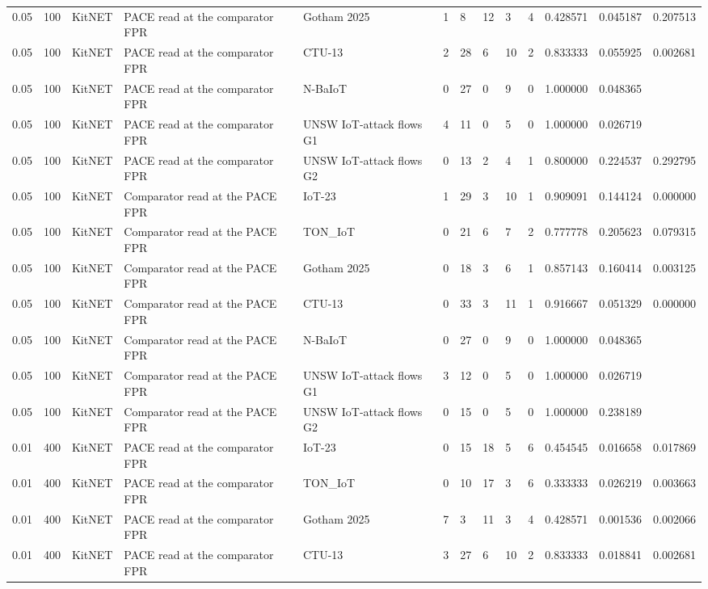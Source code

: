 \begin{tabular}{lllllllllllll}
0.05 & 100 & KitNET & PACE read at the comparator FPR & Gotham 2025 & 1 & 8 & 12 & 3 & 4 & 0.428571 & 0.045187 & 0.207513 \\
0.05 & 100 & KitNET & PACE read at the comparator FPR & CTU-13 & 2 & 28 & 6 & 10 & 2 & 0.833333 & 0.055925 & 0.002681 \\
0.05 & 100 & KitNET & PACE read at the comparator FPR & N-BaIoT & 0 & 27 & 0 & 9 & 0 & 1.000000 & 0.048365 &  \\
0.05 & 100 & KitNET & PACE read at the comparator FPR & UNSW IoT-attack flows G1 & 4 & 11 & 0 & 5 & 0 & 1.000000 & 0.026719 &  \\
0.05 & 100 & KitNET & PACE read at the comparator FPR & UNSW IoT-attack flows G2 & 0 & 13 & 2 & 4 & 1 & 0.800000 & 0.224537 & 0.292795 \\
0.05 & 100 & KitNET & Comparator read at the PACE FPR & IoT-23 & 1 & 29 & 3 & 10 & 1 & 0.909091 & 0.144124 & 0.000000 \\
0.05 & 100 & KitNET & Comparator read at the PACE FPR & TON\_IoT & 0 & 21 & 6 & 7 & 2 & 0.777778 & 0.205623 & 0.079315 \\
0.05 & 100 & KitNET & Comparator read at the PACE FPR & Gotham 2025 & 0 & 18 & 3 & 6 & 1 & 0.857143 & 0.160414 & 0.003125 \\
0.05 & 100 & KitNET & Comparator read at the PACE FPR & CTU-13 & 0 & 33 & 3 & 11 & 1 & 0.916667 & 0.051329 & 0.000000 \\
0.05 & 100 & KitNET & Comparator read at the PACE FPR & N-BaIoT & 0 & 27 & 0 & 9 & 0 & 1.000000 & 0.048365 &  \\
0.05 & 100 & KitNET & Comparator read at the PACE FPR & UNSW IoT-attack flows G1 & 3 & 12 & 0 & 5 & 0 & 1.000000 & 0.026719 &  \\
0.05 & 100 & KitNET & Comparator read at the PACE FPR & UNSW IoT-attack flows G2 & 0 & 15 & 0 & 5 & 0 & 1.000000 & 0.238189 &  \\
0.01 & 400 & KitNET & PACE read at the comparator FPR & IoT-23 & 0 & 15 & 18 & 5 & 6 & 0.454545 & 0.016658 & 0.017869 \\
0.01 & 400 & KitNET & PACE read at the comparator FPR & TON\_IoT & 0 & 10 & 17 & 3 & 6 & 0.333333 & 0.026219 & 0.003663 \\
0.01 & 400 & KitNET & PACE read at the comparator FPR & Gotham 2025 & 7 & 3 & 11 & 3 & 4 & 0.428571 & 0.001536 & 0.002066 \\
0.01 & 400 & KitNET & PACE read at the comparator FPR & CTU-13 & 3 & 27 & 6 & 10 & 2 & 0.833333 & 0.018841 & 0.002681 \\

\end{tabular}
